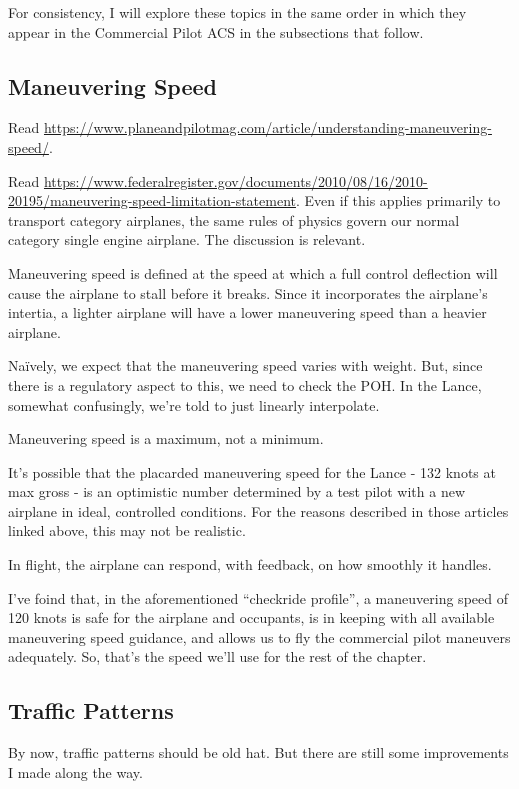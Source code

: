 For consistency, I will explore these topics in the same order in which they appear in the Commercial Pilot ACS in the subsections that follow.

\subsection{Maneuvering Speed}

Read \url{https://www.planeandpilotmag.com/article/understanding-maneuvering-speed/}.

Read \url{https://www.federalregister.gov/documents/2010/08/16/2010-20195/maneuvering-speed-limitation-statement}. Even if this applies primarily to transport category airplanes, the same rules of physics govern our normal category single engine airplane. The discussion is relevant.

Maneuvering speed is defined at the speed at which a full control deflection will cause the airplane to stall before it breaks. Since it incorporates the airplane's intertia, a lighter airplane will have a lower maneuvering speed than a heavier airplane.

Na\"ively, we expect that the maneuvering speed varies with weight. But, since there is a regulatory aspect to this, we need to check the POH. In the Lance, somewhat confusingly, we're told to just linearly interpolate.

Maneuvering speed is a maximum, not a minimum.

It's possible that the placarded maneuvering speed for the Lance - 132 knots at max gross - is an optimistic number determined by a test pilot with a new airplane in ideal, controlled conditions. For the reasons described in those articles linked above, this may not be realistic.

In flight, the airplane can respond, with feedback, on how smoothly it handles.

I've foind that, in the aforementioned ``checkride profile'', a maneuvering speed of 120 knots is safe for the airplane and occupants, is in keeping with all available maneuvering speed guidance, and allows us to fly the commercial pilot maneuvers adequately. So, that's the speed we'll use for the rest of the chapter.

\subsection{Traffic Patterns}

By now, traffic patterns should be old hat. But there are still some improvements I made along the way.

